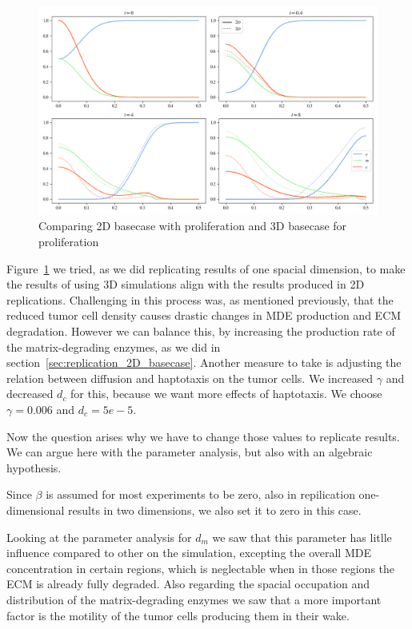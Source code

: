 \begin{figure}[h!]
    \centering
    \includegraphics[width=\textwidth]{resources/images/basecase_replication.png}
    \caption{Comparing 2D basecase with proliferation and 3D basecase for proliferation}
    \label{fig:3D_basecase_comparison}
\end{figure}
Figure~\ref{fig:3D_basecase_comparison} we tried, as we did replicating results of one spacial dimension, to make the results of using 3D simulations align with the results produced in 2D replications. Challenging in this process was, as mentioned previously, that the reduced tumor cell density causes drastic changes in MDE production and ECM degradation. However we can balance this, by increasing the production rate of the matrix-degrading enzymes, as we did in section~\ref{sec:replication_2D_basecase}. Another measure to take is adjusting the relation between diffusion and haptotaxis on the tumor cells. We increased $\gamma$ and decreased $d_c$ for this, because we want more effects of haptotaxis. We choose $\gamma=0.006$ and $d_c=5e-5$. 

Now the question arises why we have to change those values to replicate results. We can argue here with the parameter analysis, but also with an algebraic hypothesis. 

Since $\beta$ is assumed for most experiments to be zero, also in repilication one-dimensional results in two dimensions, we also set it to zero in this case. 

Looking at the parameter analysis for $d_m$ we saw that this parameter has litlle influence compared to other on the simulation, excepting the overall MDE concentration in certain regions, which is neglectable when in those regions the ECM is already fully degraded. Also regarding the spacial occupation and distribution of the matrix-degrading enzymes we saw that a more important factor is the motility of the tumor cells producing them in their wake. 

